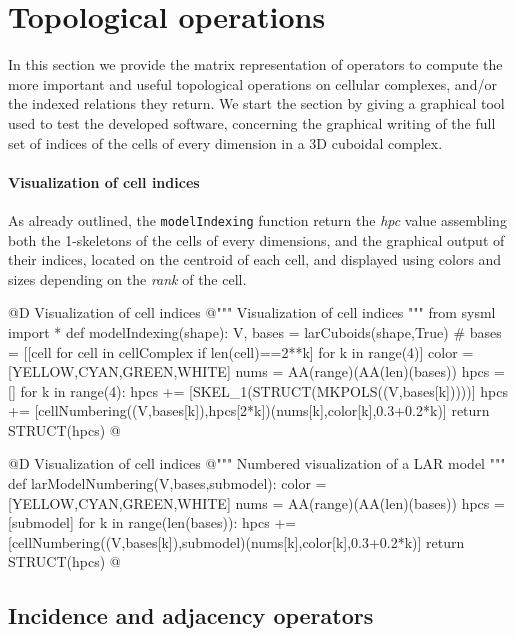 \documentclass[11pt,oneside]{article}	%
\begin{document}
\section{Topological operations}

In this section we provide the matrix representation of operators to compute the more important and useful topological operations on cellular complexes, and/or the indexed relations they return. We start the section by giving a graphical tool used to test the developed software, concerning the graphical writing of the full set of indices of the cells of every dimension in a 3D cuboidal complex.  

\paragraph{Visualization of cell indices}
As already outlined, the \texttt{modelIndexing} function return the \emph{hpc} value assembling both the 1-skeletons of the cells of every dimensions, and the graphical output of their indices, located on the centroid of each cell, and displayed using colors and sizes depending on the \emph{rank} of the cell.

@D Visualization of cell indices
@{""" Visualization of cell indices """
from sysml import *
def modelIndexing(shape):
	V, bases = larCuboids(shape,True)
	# bases = [[cell for cell in cellComplex if len(cell)==2**k] for k in range(4)]
	color = [YELLOW,CYAN,GREEN,WHITE]
	nums = AA(range)(AA(len)(bases))
	hpcs = []
	for k in range(4):
		hpcs += [SKEL_1(STRUCT(MKPOLS((V,bases[k]))))]
		hpcs += [cellNumbering((V,bases[k]),hpcs[2*k])(nums[k],color[k],0.3+0.2*k)]
	return STRUCT(hpcs)
@}


@D Visualization of cell indices
@{""" Numbered visualization of a LAR model """
def larModelNumbering(V,bases,submodel):
	color = [YELLOW,CYAN,GREEN,WHITE]
	nums = AA(range)(AA(len)(bases))
	hpcs = [submodel]
	for k in range(len(bases)):
		hpcs += [cellNumbering((V,bases[k]),submodel)(nums[k],color[k],0.3+0.2*k)]
	return STRUCT(hpcs)
@}



\subsection{Incidence and adjacency operators}
\end{document}
